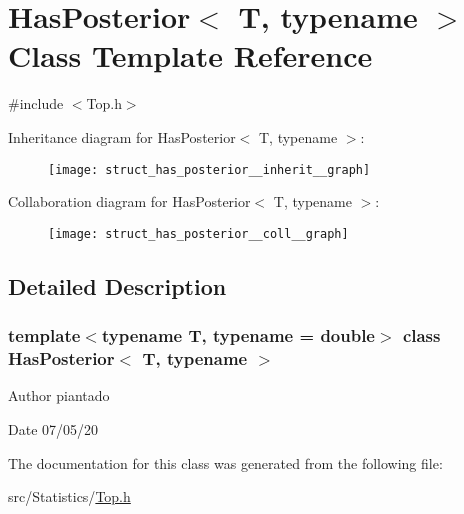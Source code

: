 \hypertarget{struct_has_posterior}{}\section{Has\+Posterior$<$ T, typename $>$ Class Template Reference}
\label{struct_has_posterior}


{\ttfamily \#include $<$Top.\+h$>$}



Inheritance diagram for Has\+Posterior$<$ T, typename $>$\+:
\nopagebreak
\begin{figure}[H]
\begin{center}
\leavevmode
\texttt{[image: struct\_has\_posterior\_\_inherit\_\_graph]}
\end{center}
\end{figure}


Collaboration diagram for Has\+Posterior$<$ T, typename $>$\+:
\nopagebreak
\begin{figure}[H]
\begin{center}
\leavevmode
\texttt{[image: struct\_has\_posterior\_\_coll\_\_graph]}
\end{center}
\end{figure}


\subsection{Detailed Description}
\subsubsection*{template$<$typename T, typename = double$>$\newline
class Has\+Posterior$<$ T, typename $>$}

\begin{DoxyAuthor}{Author}
piantado 
\end{DoxyAuthor}
\begin{DoxyDate}{Date}
07/05/20 
\end{DoxyDate}


The documentation for this class was generated from the following file\+:\begin{DoxyCompactItemize}
\item 
src/\+Statistics/\hyperlink{_top_8h}{Top.\+h}\end{DoxyCompactItemize}
